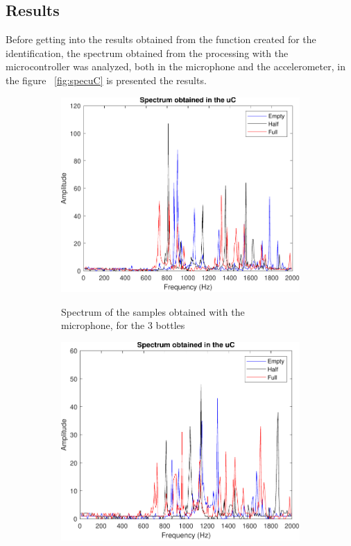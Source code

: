 \subsection{Results}
Before getting into the results obtained from the function created for the identification, the spectrum obtained from the processing with the microcontroller was analyzed, both in the microphone and the accelerometer, in the figure ~\ref{fig:specuC} is presented the results.
\begin{figure}[]
    \centering
    \begin{subfigure}{0.45\textwidth}
        \centering
        \includegraphics[width=\linewidth]{Chapters/6CHP/Figures/ResultsuCGraphs/specMICuC.pdf}
        \caption{Spectrum of the samples obtained with the microphone, for the 3 bottles}{}
        \label{subfig:specMICuc}
    \end{subfigure}
    \begin{subfigure}{0.45\textwidth}
        \centering
        \includegraphics[width=\linewidth]{Chapters/6CHP/Figures/ResultsuCGraphs/uCGraphsSen.pdf}

\end{subfigure}
\end{figure}
